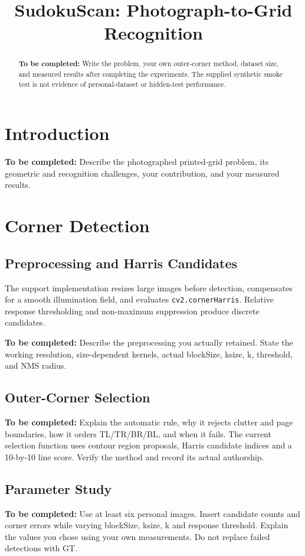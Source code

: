 \documentclass[conference]{IEEEtran}
\title{SudokuScan: Photograph-to-Grid Recognition}
\author{\IEEEauthorblockN{STUDENT NAME}
\IEEEauthorblockA{Department of Computer Engineering, MEF University\\
COMP 482, Fall 2026\\Student number: STUDENT NUMBER}}
\newcommand{\draftnote}[1]{\par\noindent\textbf{To be completed:} #1\par}
\begin{document}
\maketitle
\begin{abstract}
\draftnote{Write the problem, your own outer-corner method, dataset size, and
measured results after completing the experiments. The supplied synthetic smoke
test is not evidence of personal-dataset or hidden-test performance.}
\end{abstract}

\section{Introduction}
\draftnote{Describe the photographed printed-grid problem, its geometric and
recognition challenges, your contribution, and your measured results.}

\section{Corner Detection}
\subsection{Preprocessing and Harris Candidates}
The support implementation resizes large images before detection, compensates
for a smooth illumination field, and evaluates \texttt{cv2.cornerHarris}.
Relative response thresholding and non-maximum suppression produce discrete candidates.
\draftnote{Describe the preprocessing you actually retained. State the working
resolution, size-dependent kernels, actual blockSize, ksize, k, threshold, and NMS radius.}

\subsection{Outer-Corner Selection}
\draftnote{Explain the automatic rule, why it
rejects clutter and page boundaries, how it orders TL/TR/BR/BL, and when it fails.
The current selection function uses contour region proposals, Harris candidate indices and a 10-by-10 line score. Verify the method and record its actual authorship.}

\subsection{Parameter Study}
\draftnote{Use at least six personal images. Insert candidate counts and corner
errors while varying blockSize, ksize, k and response threshold. Explain the values
you chose using your own measurements. Do not replace failed detections with GT.}
\end{document}
